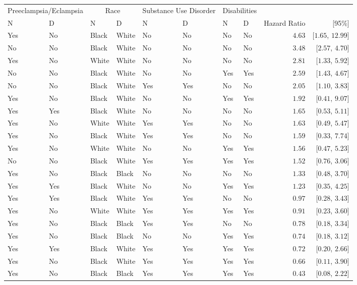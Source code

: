 \begin{longtable}{llllllllrr}
\toprule
\multicolumn{2}{c}{Preeclampsia/Eclampsia} & \multicolumn{2}{c}{Race} & \multicolumn{2}{c}{Substance Use Disorder} & \multicolumn{2}{c}{Disabilities} &  &  \\ 
\cmidrule(lr){1-2} \cmidrule(lr){3-4} \cmidrule(lr){5-6} \cmidrule(lr){7-8}
N & D & N & D & N & D & N & D & Hazard Ratio & [95\%] \\ 
\midrule
Yes & No & Black & White & No & No & No & No & $4.63$ & [$1.65$, $12.99$] \\ 
No & No & Black & White & No & No & No & No & $3.48$ & [$2.57$, $4.70$] \\ 
Yes & No & White & White & No & No & No & No & $2.81$ & [$1.33$, $5.92$] \\ 
No & No & Black & White & No & No & Yes & Yes & $2.59$ & [$1.43$, $4.67$] \\ 
No & No & Black & White & Yes & Yes & No & No & $2.05$ & [$1.10$, $3.83$] \\ 
Yes & No & Black & White & No & No & Yes & Yes & $1.92$ & [$0.41$, $9.07$] \\ 
Yes & Yes & Black & White & No & No & No & No & $1.65$ & [$0.53$, $5.11$] \\ 
Yes & No & White & White & Yes & Yes & No & No & $1.63$ & [$0.49$, $5.47$] \\ 
Yes & No & Black & White & Yes & Yes & No & No & $1.59$ & [$0.33$, $7.74$] \\ 
Yes & No & White & White & No & No & Yes & Yes & $1.56$ & [$0.47$, $5.23$] \\ 
No & No & Black & White & Yes & Yes & Yes & Yes & $1.52$ & [$0.76$, $3.06$] \\ 
Yes & No & Black & Black & No & No & No & No & $1.33$ & [$0.48$, $3.70$] \\ 
Yes & Yes & Black & White & No & No & Yes & Yes & $1.23$ & [$0.35$, $4.25$] \\ 
Yes & Yes & Black & White & Yes & Yes & No & No & $0.97$ & [$0.28$, $3.43$] \\ 
Yes & No & White & White & Yes & Yes & Yes & Yes & $0.91$ & [$0.23$, $3.60$] \\ 
Yes & No & Black & Black & Yes & Yes & No & No & $0.78$ & [$0.18$, $3.34$] \\ 
Yes & No & Black & Black & No & No & Yes & Yes & $0.74$ & [$0.18$, $3.12$] \\ 
Yes & Yes & Black & White & Yes & Yes & Yes & Yes & $0.72$ & [$0.20$, $2.66$] \\ 
Yes & No & Black & White & Yes & Yes & Yes & Yes & $0.66$ & [$0.11$, $3.90$] \\ 
Yes & No & Black & Black & Yes & Yes & Yes & Yes & $0.43$ & [$0.08$, $2.22$] \\ 
\bottomrule
\end{longtable}

